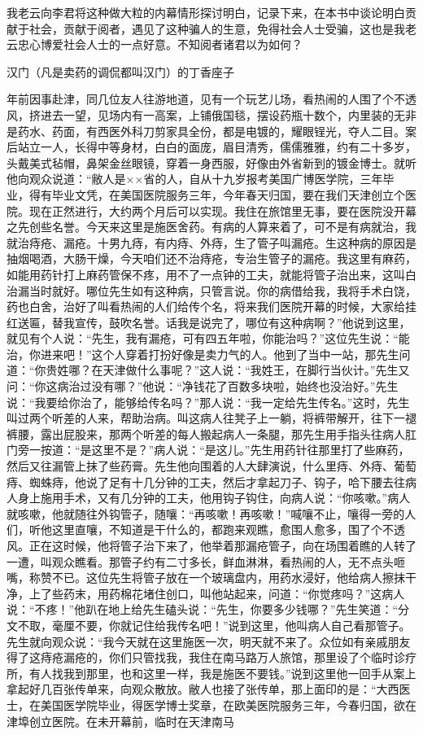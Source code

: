 \documentclass[12pt,UTF8]{ctexbook}
\begin{document}
我老云向李君将这种做大粒的内幕情形探讨明白，记录下来，在本书中谈论明白贡献于社会，贡献于阅者，遇见了这种骗人的生意，免得社会人士受骗，这也是我老云忠心博爱社会人士的一点好意。不知阅者诸君以为如何？





汉门（凡是卖药的调侃都叫汉门）的丁香座子


年前因事赴津，同几位友人往游地道，见有一个玩艺儿场，看热闹的人围了个不透风，挤进去一望，见场内有一高案，上铺俄国毯，摆设药瓶十数个，内里装的无非是药水、药面，有西医外科刀剪家具全份，都是电镀的，耀眼锃光，夺人二目。案后站立一人，长得中等身材，白白的面庞，眉目清秀，儒儒雅雅，约有二十多岁，头戴美式毡帽，鼻架金丝眼镜，穿着一身西服，好像由外省新到的镀金博士。就听他向观众说道：“敝人是××省的人，自从十九岁报考美国广博医学院，三年毕业，得有毕业文凭，在美国医院服务三年，今年春天归国，要在我们天津创立个医院。现在正然进行，大约两个月后可以实现。我住在旅馆里无事，要在医院没开幕之先创些名誉。今天来这里是施医舍药。有病的人算来着了，可不是有病就治，我就治痔疮、漏疮。十男九痔，有内痔、外痔，生了管子叫漏疮。生这种病的原因是抽烟喝酒，大肠干燥，今天咱们还不治痔疮，专治生管子的漏疮。我这里有麻药，如能用药针打上麻药管保不疼，用不了一点钟的工夫，就能将管子治出来，这叫白治漏当时就好。哪位先生如有这种病，只管言说。你的病借给我，我将手术白饶，药也白舍，治好了叫看热闹的人们给传个名，将来我们医院开幕的时候，大家给挂红送匾，替我宣传，鼓吹名誉。话我是说完了，哪位有这种病啊？”他说到这里，就见有个人说：“先生，我有漏疮，可有四五年啦，你能治吗？”这位先生说：“能治，你进来吧！”这个人穿着打扮好像是卖力气的人。他到了当中一站，那先生问道：“你贵姓哪？在天津做什么事呢？”这人说：“我姓王，在脚行当伙计。”先生又问：“你这病治过没有哪？”他说：“净钱花了百数多块啦，始终也没治好。”先生说：“我要给你治了，能够给传名吗？”那人说：“我一定给先生传名。”这时，先生叫过两个听差的人来，帮助治病。叫这病人往凳子上一躺，将裤带解开，往下一褪裤腰，露出屁股来，那两个听差的每人搬起病人一条腿，那先生用手指头往病人肛门旁一按道：“是这里不是？”病人说：“是这儿。”先生用药针往那里打了些麻药，然后又往漏管上抹了些药膏。先生他向围着的人大肆演说，什么里痔、外痔、葡萄痔、蜘蛛痔，他说了足有十几分钟的工夫，然后才拿起刀子、钩子，哈下腰去往病人身上施用手术，又有几分钟的工夫，他用钩子钩住，向病人说：“你咳嗽。”病人就咳嗽，他就随往外钩管子，随嚷：“再咳嗽！再咳嗽！”喊嚷不止，嚷得一旁的人们，听他这里直嚷，不知道是干什么的，都跑来观瞧，愈围人愈多，围了个不透风。正在这时候，他将管子治下来了，他举着那漏疮管子，向在场围着瞧的人转了一遭，叫观众瞧看。那管子约有二寸多长，鲜血淋淋，看热闹的人，无不点头咂嘴，称赞不已。这位先生将管子放在一个玻璃盘内，用药水浸好，他给病人擦抹干净，上了些药末，用药棉花堵住创口，叫他站起来，问道：“你觉疼吗？”这病人说：“不疼！”他趴在地上给先生磕头说：“先生，你要多少钱哪？”先生笑道：“分文不取，毫厘不要，你就记住给我传名吧！”说到这里，他叫病人自己看那管子。先生就向观众说：“我今天就在这里施医一次，明天就不来了。众位如有亲戚朋友得了这痔疮漏疮的，你们只管找我，我住在南马路万人旅馆，那里设了个临时诊疗所，有人找我到那里，也和这里一样，我是施医不要钱。”说到这里他一回手从案上拿起好几百张传单来，向观众散放。敝人也接了张传单，那上面印的是：“大西医士，在美国医学院毕业，得医学博士奖章，在欧美医院服务三年，今春归国，欲在津埠创立医院。在未开幕前，临时在天津南马
\end{document}
